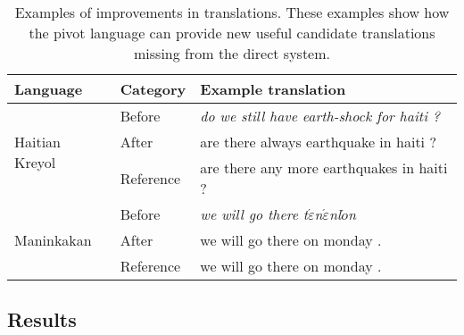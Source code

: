 \documentclass[11pt]{article}
\begin{document}
		
	\begin{table*}[t]
    \centering
    {
	\begin{tabular}{|l|l|l|}
		\toprule
		Language & Category & Example translation \\
		\toprule
		\multirow{3}{*}{Haitian Kreyol} & Before & \emph{do we still have earth-shock for haiti ?} \\ & After & are there always earthquake in haiti ? \\ & Reference &  are there any more earthquakes in haiti ?\\
		\midrule
		\multirow{3}{*}{Maninkakan} & Before & \emph{we will go there t$\acute{\varepsilon}$n$\acute{\varepsilon}$nl$\acute{o}$n} \\ & After & we will go there on monday .\\ & Reference & we will go there on monday . \\
		\bottomrule
	\end{tabular}
    }
	\caption{Examples of improvements in translations. These examples show how the pivot language can provide new useful candidate translations missing from the direct system.}	
	\label{table:example_translations}
	\end{table*}
\subsection{Results}
\label{sec:results}
	
\end{document}
